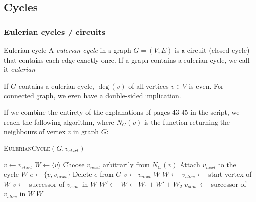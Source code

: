 \newpage
\subsection{Cycles}

\subsubsection{Eulerian cycles / circuits}
\begin{definition}[]{Eulerian cycle}
    A \textit{eulerian cycle} in a graph $G = (V, E)$ is a circuit (closed cycle) that contains each edge exactly once.
    If a graph contains a eulerian cycle, we call it \textit{eulerian}
\end{definition}
If $G$ contains a eulerian cycle, $\deg(v)$ of all vertices $v \in V$ is even. For connected graph, we even have a double-sided implication.

If we combine the entirety of the explanations of pages 43-45 in the script, we reach the following algorithm, where $N_G(v)$ is the function returning the neighbours of vertex $v$ in graph $G$:
\begin{algorithm}
    \caption{\textsc{EulerianCycle}$(G, v_{start})$}
    \begin{algorithmic}[1]
            \State $v \gets v_{start}$
            \State $W \gets \langle v \rangle$ 
                \State Choose $v_{next}$ arbitrarily from $N_G(v)$ 
                \State Attach $v_{next}$ to the cycle $W$
                \State $e \gets \{v, v_{next}\}$
                \State Delete $e$ from $G$
                \State $v \gets v_{next}$
            \EndWhile
            \State \Return $W$
        \EndProcedure
        \State $W \gets$  
        \State $v_{slow} \gets$ start vertex of $W$
            \State $v \gets$ successor of $v_{slow}$ in $W$
                \State $W' \gets$ 
                \State $W \gets W_1 + W' + W_2$ 
            \EndIf
            \State $v_{slow} \gets$ successor of $v_{slow}$ in $W$
        \EndWhile
        \State \Return $W$
    \end{algorithmic}
\end{algorithm}

